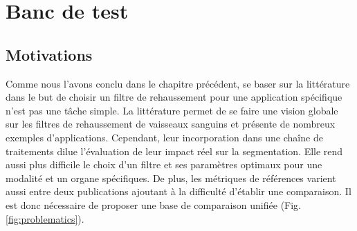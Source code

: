 %

\chapter{Banc de test}
\label{sec:Benchmark}


\section{Motivations}
\label{sec:Benchmark}


Comme nous l'avons conclu dans le chapitre précédent, se baser sur la littérature dans le but de choisir un filtre de rehaussement pour une application spécifique n'est pas une tâche simple. La littérature permet de se faire une vision globale sur les filtres de rehaussement de vaisseaux sanguins et présente de nombreux exemples d'applications. Cependant, leur incorporation dans une chaîne de traitements dilue l'évaluation de leur impact réel sur la segmentation. Elle rend aussi plus difficile le choix d'un filtre et ses paramètres optimaux pour une modalité et un organe spécifiques. De plus, les métriques de références varient aussi entre deux publications ajoutant à la difficulté d'établir une comparaison. Il est donc nécessaire de proposer une base de
 comparaison unifiée (Fig. \ref{fig:problematics}).

